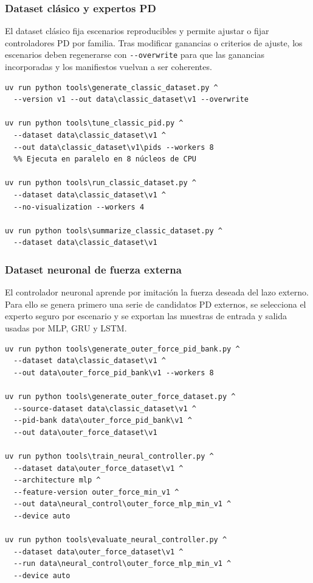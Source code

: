 \subsubsection*{Dataset clásico y expertos PD}

El dataset clásico fija escenarios reproducibles y permite ajustar o fijar
controladores PD por familia. Tras modificar ganancias o criterios de ajuste,
los escenarios deben regenerarse con \texttt{-}\texttt{-overwrite} para que las ganancias
incorporadas y los manifiestos vuelvan a ser coherentes.

\begin{verbatim}
uv run python tools\generate_classic_dataset.py ^
  --version v1 --out data\classic_dataset\v1 --overwrite

uv run python tools\tune_classic_pid.py ^
  --dataset data\classic_dataset\v1 ^
  --out data\classic_dataset\v1\pids --workers 8
  %% Ejecuta en paralelo en 8 núcleos de CPU

uv run python tools\run_classic_dataset.py ^
  --dataset data\classic_dataset\v1 ^
  --no-visualization --workers 4

uv run python tools\summarize_classic_dataset.py ^
  --dataset data\classic_dataset\v1
\end{verbatim}

\subsubsection*{Dataset neuronal de fuerza externa}

El controlador neuronal aprende por imitación la fuerza deseada del lazo externo.
Para ello se genera primero una serie de candidatos PD externos, se selecciona
el experto seguro por escenario y se exportan las muestras de
entrada y salida usadas por MLP, GRU y LSTM.

\begin{verbatim}
uv run python tools\generate_outer_force_pid_bank.py ^
  --dataset data\classic_dataset\v1 ^
  --out data\outer_force_pid_bank\v1 --workers 8

uv run python tools\generate_outer_force_dataset.py ^
  --source-dataset data\classic_dataset\v1 ^
  --pid-bank data\outer_force_pid_bank\v1 ^
  --out data\outer_force_dataset\v1

uv run python tools\train_neural_controller.py ^
  --dataset data\outer_force_dataset\v1 ^
  --architecture mlp ^
  --feature-version outer_force_min_v1 ^
  --out data\neural_control\outer_force_mlp_min_v1 ^
  --device auto

uv run python tools\evaluate_neural_controller.py ^
  --dataset data\outer_force_dataset\v1 ^
  --run data\neural_control\outer_force_mlp_min_v1 ^
  --device auto
\end{verbatim}

